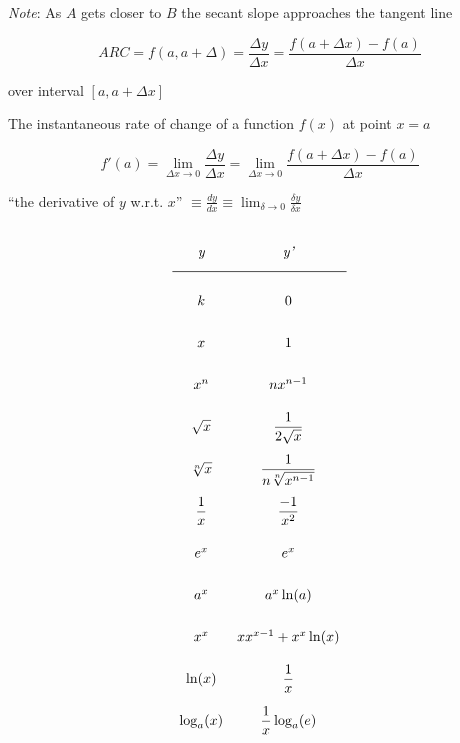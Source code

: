 \textit{Note}: As $A$ gets	closer to $B$ the secant slope approaches the tangent line
\hformbar




\begin{equation}
    ARC = f(a, a + \Delta) = \frac{\Delta y}{\Delta x} = \frac{f(a + \Delta x) - f(a)}{\Delta x}
\end{equation}

over interval $[a, a + \Delta x]$
\hformbar




The instantaneous rate of change of a function $f(x)$ at point $x = a$

\begin{equation}
    f'(a) = \lim_{\Delta x \to 0} \frac{\Delta y}{\Delta x} = \lim_{\Delta x \to 0} \frac{f(a + \Delta x) - f(a)}{\Delta x}
\end{equation}

``the derivative of $y$ w.r.t. $x$'' $\equiv \frac{dy}{dx} \equiv \lim_{\delta \rightarrow 0} \frac{\delta y}{\delta x}$

\hformbar








\begin{center}
\[
\def\arraystretch{2.5}
 \begin{array}{cc}
  \textit{y}   &      \textit{y'}             \\
  \midrule
  k            & 0                             \\
  x            & 1                             \\ 
  x^n          & nx^{n-1}                      \\
  \sqrt{x}     & \dfrac{1}{2\sqrt{x}}          \\
  \sqrt[n]{x}  & \dfrac{1}{n\sqrt[n]{x^{n-1}}} \\
  \dfrac{1}{x} & \dfrac{-1}{x^2}               \\ 
  e^x          & e^x                           \\
  a^x          & a^x\ln(a)                     \\
  x^x          & xx^{x-1}+x^x\ln(x)            \\
  \ln(x)       & \dfrac{1}{x}                  \\
  \log_a(x)    & \dfrac{1}{x}\log_a(e)         
 \end{array}
\]
\end{center}
\hformbar



